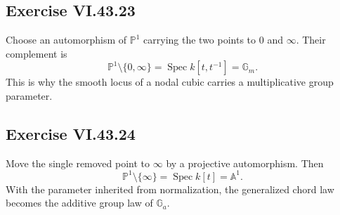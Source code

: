 \subsection*{Exercise VI.43.23}
\begin{solution}
Choose an automorphism of \(\mathbb P^1\) carrying the two points to \(0\) and \(\infty\).  Their complement is
\[
\mathbb P^1\setminus\{0,\infty\}=\operatorname{Spec}k[t,t^{-1}]=\mathbb G_m.
\]
This is why the smooth locus of a nodal cubic carries a multiplicative group parameter.
\end{solution}

\subsection*{Exercise VI.43.24}
\begin{solution}
Move the single removed point to \(\infty\) by a projective automorphism.  Then
\[
\mathbb P^1\setminus\{\infty\}=\operatorname{Spec}k[t]=\mathbb A^1.
\]
With the parameter inherited from normalization, the generalized chord law becomes the additive group law of \(\mathbb G_a\).
\end{solution}

